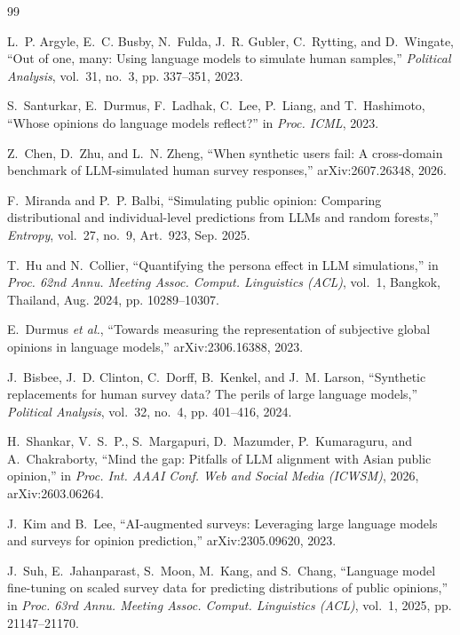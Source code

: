 \documentclass[conference]{IEEEtran}
\begin{document}
\begin{thebibliography}{99}

L.~P. Argyle, E.~C. Busby, N.~Fulda, J.~R. Gubler, C.~Rytting, and D.~Wingate, ``Out of one, many: Using language models to simulate human samples,'' \emph{Political Analysis}, vol.~31, no.~3, pp. 337--351, 2023.

S.~Santurkar, E.~Durmus, F.~Ladhak, C.~Lee, P.~Liang, and T.~Hashimoto, ``Whose opinions do language models reflect?'' in \emph{Proc. ICML}, 2023.

Z.~Chen, D.~Zhu, and L.~N. Zheng, ``When synthetic users fail: A cross-domain benchmark of LLM-simulated human survey responses,'' arXiv:2607.26348, 2026.

F.~Miranda and P.~P. Balbi, ``Simulating public opinion: Comparing distributional and individual-level predictions from LLMs and random forests,'' \emph{Entropy}, vol.~27, no.~9, Art.~923, Sep. 2025.

T.~Hu and N.~Collier, ``Quantifying the persona effect in LLM simulations,'' in \emph{Proc. 62nd Annu. Meeting Assoc. Comput. Linguistics (ACL)}, vol.~1, Bangkok, Thailand, Aug. 2024, pp. 10289--10307.

E.~Durmus \emph{et al.}, ``Towards measuring the representation of subjective global opinions in language models,'' arXiv:2306.16388, 2023.

J.~Bisbee, J.~D. Clinton, C.~Dorff, B.~Kenkel, and J.~M. Larson, ``Synthetic replacements for human survey data? The perils of large language models,'' \emph{Political Analysis}, vol.~32, no.~4, pp. 401--416, 2024.

H.~Shankar, V.~S.~P., S.~Margapuri, D.~Mazumder, P.~Kumaraguru, and A.~Chakraborty, ``Mind the gap: Pitfalls of LLM alignment with Asian public opinion,'' in \emph{Proc. Int. AAAI Conf. Web and Social Media (ICWSM)}, 2026, arXiv:2603.06264.

J.~Kim and B.~Lee, ``AI-augmented surveys: Leveraging large language models and surveys for opinion prediction,'' arXiv:2305.09620, 2023.

J.~Suh, E.~Jahanparast, S.~Moon, M.~Kang, and S.~Chang, ``Language model fine-tuning on scaled survey data for predicting distributions of public opinions,'' in \emph{Proc. 63rd Annu. Meeting Assoc. Comput. Linguistics (ACL)}, vol.~1, 2025, pp. 21147--21170.


\end{thebibliography}
\end{document}
